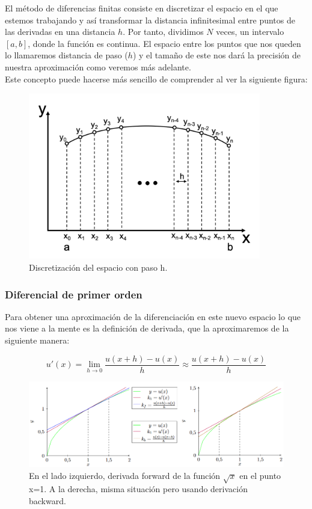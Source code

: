 \documentclass[12pt]{article}
\begin{document}
El método de diferencias finitas consiste en discretizar el espacio en el que estemos trabajando y así transformar la distancia infinitesimal entre puntos de las derivadas en una distancia $h$. Por tanto, dividimos $N$ veces, un intervalo $[a,b]$, donde la función es continua. El espacio entre los puntos que nos queden lo llamaremos distancia de paso ($h$) y el tamaño de este nos dará la precisión de nuestra aproximación como veremos más adelante.\\

\newpage
Este concepto puede hacerse más sencillo de comprender al ver la siguiente figura:

\begin{figure}[H]
\centering
\includegraphics[width=4in]{23.03.01-Finite-difference}
\caption{Discretización del espacio con paso h.}
\label{finite_difference}
\end{figure}


\subsubsection{Diferencial de primer orden}

Para obtener una aproximación de la diferenciación en este nuevo espacio lo que nos viene a la mente es la definición de derivada, que la aproximaremos de la siguiente manera:

\begin{equation}\label{eq:eq1}
u'(x)=\lim_{h \to 0}  \frac{u(x+h)-u(x)}{h} \approx \frac{u(x+h)-u(x)}{h}
\end{equation}

\begin{figure}[H]
    \centering
    \begin{adjustbox}{width=1.15\linewidth,center}
        \includegraphics{fotos/dffttudo.png}
    \end{adjustbox}
    \caption{En el lado izquierdo, derivada forward de la función $\sqrt{x}$ en el punto x=1. A la derecha, misma situación pero usando derivación backward.}
    \label{fg:ttudo}
\end{figure}
\end{document}
